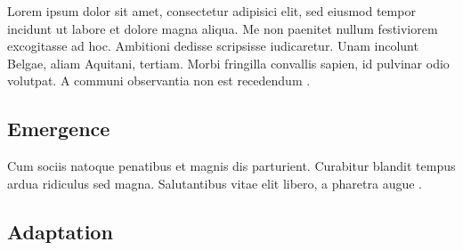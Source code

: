 \documentclass[
  man,
  10pt,
  a4paper,
  floatsintext
]{apa7}
\begin{document}
Lorem ipsum dolor sit amet, consectetur adipisici elit, sed eiusmod tempor incidunt ut labore et dolore magna aliqua. Me non paenitet nullum festiviorem excogitasse ad hoc. Ambitioni dedisse scripsisse iudicaretur. Unam incolunt Belgae, aliam Aquitani, tertiam. Morbi fringilla convallis sapien, id pulvinar odio volutpat. A communi observantia non est recedendum \autocite{janssen2020}.

\subsection{Emergence}

\begin{guidingbox}
  \begin{tcbitemize}
    \item[\gddarkredb{\arrowbullet}] 
    \item[\gddarkcornflowerblueb{\arrowbullet}] 
  \end{tcbitemize}
\end{guidingbox}

Cum sociis natoque penatibus et magnis dis parturient. Curabitur blandit tempus ardua ridiculus sed magna. Salutantibus vitae elit libero, a pharetra augue \autocite{smaldino2023}.

\subsection{Adaptation}
\end{document}
